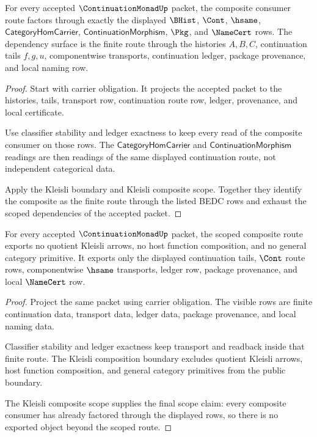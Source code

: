 \begin{theorem}
\label{thm:continuation-monad-scoped-route-dependencies}
For every accepted $\ContinuationMonadUp$ packet, the composite consumer route factors through exactly the displayed $\BHist$, $\Cont$, $\hsame$, $\mathsf{CategoryHomCarrier}$, $\mathsf{ContinuationMorphism}$, $\Pkg$, and $\NameCert$ rows. The dependency surface is the finite route through the histories $A,B,C$, continuation tails $f,g,u$, componentwise transports, continuation ledger, package provenance, and local naming row.
\end{theorem}
\begin{proof}
Start with carrier obligation. It projects the accepted packet to the histories, tails, transport row, continuation route row, ledger, provenance, and local certificate.

Use classifier stability and ledger exactness to keep every read of the composite consumer on those rows. The $\mathsf{CategoryHomCarrier}$ and $\mathsf{ContinuationMorphism}$ readings are then readings of the same displayed continuation route, not independent categorical data.

Apply the Kleisli boundary and Kleisli composite scope. Together they identify the composite as the finite route through the listed BEDC rows and exhaust the scoped dependencies of the accepted packet.
\end{proof}

\begin{theorem}
\label{thm:continuation-monad-scope-nonescape}
For every accepted $\ContinuationMonadUp$ packet, the scoped composite route exports no quotient Kleisli arrows, no host function composition, and no general category primitive. It exports only the displayed continuation tails, $\Cont$ route rows, componentwise $\hsame$ transports, ledger row, package provenance, and local $\NameCert$ row.
\end{theorem}
\begin{proof}
Project the same packet using carrier obligation. The visible rows are finite continuation data, transport data, ledger data, package provenance, and local naming data.

Classifier stability and ledger exactness keep transport and readback inside that finite route. The Kleisli composition boundary excludes quotient Kleisli arrows, host function composition, and general category primitives from the public boundary.

The Kleisli composite scope supplies the final scope claim: every composite consumer has already factored through the displayed rows, so there is no exported object beyond the scoped route.
\end{proof}

